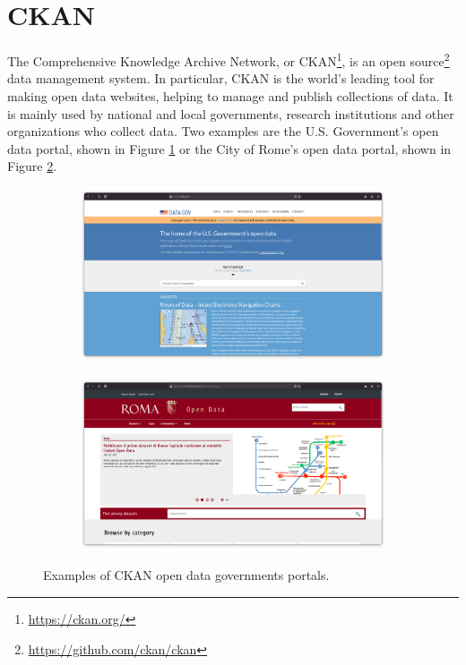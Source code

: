 \section{CKAN}
\label{sec:ckan}

The Comprehensive Knowledge Archive Network, or CKAN\footnote{\url{https://ckan.org/}}, is an open source\footnote{\url{https://github.com/ckan/ckan}} data management system. In particular, CKAN is the world's leading tool for making open data websites, helping to manage and publish collections of data. It is mainly used by national and local governments, research institutions and other organizations who collect data. Two examples are the U.S. Government's open data portal, shown in Figure \ref{fig:ckan-usa} or the City of Rome's open data portal, shown in Figure \ref{fig:ckan-rome}.

\begin{figure}
  \begin{subfigure}{.5\columnwidth}
    \centering
    \includegraphics[width=.99\linewidth]{images/ckan/ckan-usa}
    \label{fig:ckan-usa}
  \end{subfigure}%
  \begin{subfigure}{.5\columnwidth}
    \centering
    \includegraphics[width=.99\linewidth]{images/ckan/ckan-roma}
    \label{fig:ckan-rome}
  \end{subfigure}
  \caption{Examples of CKAN open data governments portals.}
  \label{fig:ckan-examples}
\end{figure}

